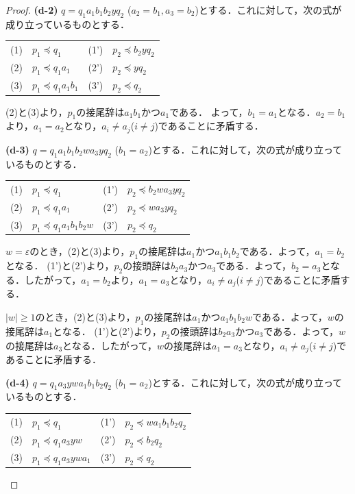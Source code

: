 \begin{proof}
\textbf{(d-2)} $q=q_{1}a_{1}b_{1}b_{2}yq_{2}$ ($a_{2}=b_{1}, a_{3}=b_{2}$)とする．これに対して，次の式が成り立っているものとする．

\begin{tabular}{llll}
(1) & $p_{1} \preceq q_{1}$ & (1') & $p_{2} \preceq b_{2}yq_{2}$ \\
(2) & $p_{1} \preceq q_{1}a_{1}$ & (2') & $p_{2} \preceq yq_{2}$ \\
(3) & $p_{1} \preceq q_{1}a_{1}b_{1}$ & (3') & $p_{2} \preceq q_{2}$
\end{tabular}
\smallskip

(2)と(3)より，$p_{1}$の接尾辞は$a_{1}b_{1}$かつ$a_{1}$である．
よって，$b_{1}=a_{1}$となる．$a_{2}=b_{1}$より，$a_{1}=a_{2}$となり，$a_{i} \ne a_{j}$($i \ne j$)であることに矛盾する．
\smallskip

\textbf{(d-3)} $q=q_{1}a_{1}b_{1}b_{2}wa_{3}yq_{2}$ ($b_{1}=a_{2}$)とする．これに対して，次の式が成り立っているものとする．
\smallskip

\begin{tabular}{llll}
(1) & $p_{1} \preceq q_{1}$ & (1') & $p_{2} \preceq b_{2}wa_{3}yq_{2}$ \\
(2) & $p_{1} \preceq q_{1}a_{1}$ & (2') & $p_{2} \preceq wa_{3}yq_{2}$ \\
(3) & $p_{1} \preceq q_{1}a_{1}b_{1}b_{2}w$ & (3') & $p_{2} \preceq q_{2}$
\end{tabular}
\smallskip

$w=\varepsilon$のとき，(2)と(3)より，$p_{1}$の接尾辞は$a_{1}$かつ$a_{1}b_{1}b_{2}$である．よって，$a_{1}=b_{2}$となる．
(1')と(2')より，$p_{2}$の接頭辞は$b_{2}a_{3}$かつ$a_{3}$である．よって，$b_{2}=a_{3}$となる．したがって，$a_{1}=b_{2}$より，$a_{1}=a_{3}$となり，$a_{i} \ne a_{j}$($i \ne j$)であることに矛盾する．

$|w| \ge 1$のとき，(2)と(3)より，$p_{1}$の接尾辞は$a_{1}$かつ$a_{1}b_{1}b_{2}w$である．よって，$w$の接尾辞は$a_{1}$となる．
(1')と(2')より，$p_{2}$の接頭辞は$b_{2}a_{3}$かつ$a_{3}$である．よって，$w$の接尾辞は$a_{3}$となる．したがって，$w$の接尾辞は$a_{1}=a_{3}$となり，$a_{i} \ne a_{j}$($i \ne j$)であることに矛盾する．
\smallskip

\textbf{(d-4)} $q=q_{1}a_{3}ywa_{1}b_{1}b_{2}q_{2}$ ($b_{1}=a_{2}$)とする．これに対して，次の式が成り立っているものとする．
\smallskip

\begin{tabular}{llll}
(1) & $p_{1} \preceq q_{1}$ & (1') & $p_{2} \preceq wa_{1}b_{1}b_{2}q_{2}$ \\
(2) & $p_{1} \preceq q_{1}a_{3}yw$ & (2') & $p_{2} \preceq b_{2}q_{2}$ \\
(3) & $p_{1} \preceq q_{1}a_{3}ywa_{1}$ & (3') & $p_{2} \preceq q_{2}$
\end{tabular}
\smallskip


\end{proof}
